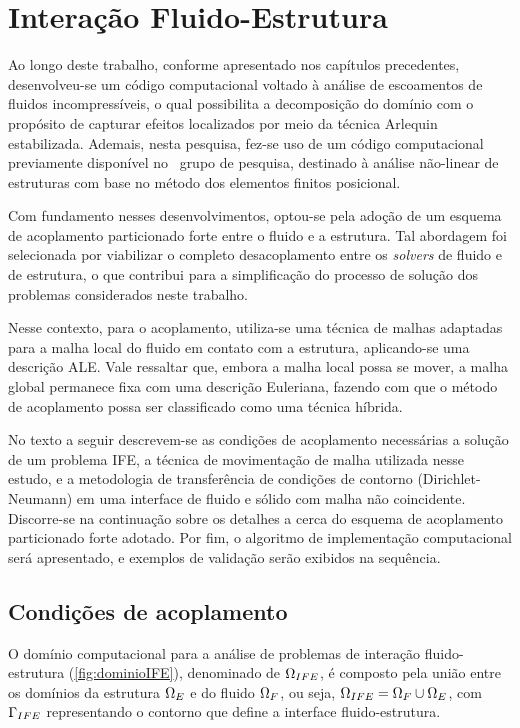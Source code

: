 \chapter[Acoplamento Fluido-Estrutura]{Interação Fluido-Estrutura} \label{capitulo:Cap7}

Ao longo deste trabalho, conforme apresentado nos capítulos precedentes, desenvolveu-se um código computacional voltado à análise de escoamentos de fluidos incompressíveis, o qual possibilita a decomposição do domínio com o propósito de capturar efeitos localizados por meio da técnica Arlequin estabilizada. Ademais, nesta pesquisa, fez-se uso de um código computacional previamente disponível no ~grupo de pesquisa, destinado à análise não-linear de estruturas com base no método dos elementos finitos posicional.

Com fundamento nesses desenvolvimentos, optou-se pela adoção de um esquema de acoplamento particionado forte entre o fluido e a estrutura. Tal abordagem foi selecionada por viabilizar o completo desacoplamento entre os \textit{solvers} de fluido e de estrutura, o que contribui para a simplificação do processo de solução dos problemas considerados neste trabalho.

Nesse contexto, para o acoplamento, utiliza-se uma técnica de malhas adaptadas para a malha local do fluido em contato com a estrutura, aplicando-se uma descrição ALE. Vale ressaltar que, embora a malha local possa se mover, a malha global permanece fixa com uma descrição Euleriana, fazendo com que o método de acoplamento possa ser classificado como uma técnica híbrida.
 
No texto a seguir descrevem-se as condições de acoplamento necessárias a solução de um problema IFE, a técnica de movimentação de malha utilizada nesse estudo, e a metodologia de transferência de condições de contorno (Dirichlet-Neumann) em uma interface de fluido e sólido com malha não coincidente. Discorre-se na continuação sobre os detalhes a cerca do esquema de acoplamento particionado forte adotado. Por fim, o algoritmo de implementação computacional será apresentado, e exemplos de validação serão exibidos na sequência.

\section{Condições de acoplamento}

O domínio computacional para a análise de problemas de interação fluido-estrutura (\autoref{fig:dominioIFE}), denominado de $\Omega_{IFE}$, é composto pela união entre os domínios da estrutura $\Omega_{E}$ e do fluido $\Omega_{F}$, ou seja, $\Omega_{IFE} = \Omega_{F} \cup \Omega_{E}$, com $\Gamma_{IFE}$ representando o contorno que define a interface fluido-estrutura.

